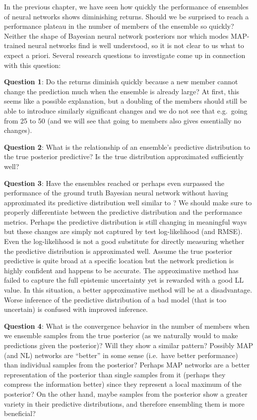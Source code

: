 \documentclass[../thesis.tex]{subfiles}
\begin{document}
In the previous chapter, we have seen how quickly the performance of ensembles of neural networks shows diminishing returns.
Should we be surprised to reach a performance plateau in the number of members of the ensemble so quickly? Neither the shape of Bayesian neural network posteriors nor which modes MAP-trained neural networks find is well understood, so it is not clear to us what to expect a priori.
Several research questions to investigate come up in connection with this question:
\medskip

\noindent \textbf{Question 1}: Do the returns diminish quickly because a new member cannot change the prediction much when the ensemble is already large? At first, this seems like a possible explanation, but a doubling of the members should still be able to introduce similarly significant changes and we do not see that e.g.\ going from 25 to 50 (and we will see that going to  members also gives essentially no changes). 
\medskip

\noindent \textbf{Question 2}: What is the relationship of an ensemble's predictive distribution to the true posterior predictive? Is the true distribution approximated sufficiently well? 
\medskip

\noindent \textbf{Question 3}: Have the ensembles reached or perhaps even surpassed the performance of the ground truth Bayesian neural network without having approximated its predictive distribution well similar to \textcite{yao2019quality}? We should make sure to properly differentiate between the predictive distribution and the performance metrics. Perhaps the predictive distribution is still changing in meaningful ways but these changes are simply not captured by test log-likelihood (and RMSE). 
Even the log-likelihood is not a good substitute for directly measuring whether the predictive distribution is approximated well.
Assume the true posterior predictive is quite broad at a specific location but the network prediction is highly confident and happens to be accurate. The approximative method has failed to capture the full epistemic uncertainty yet is rewarded with a good LL value. In this situation, a better approximative method will be at a disadvantage. Worse inference of the predictive distribution of a bad model (that is too uncertain) is confused with improved inference.
\medskip

\noindent \textbf{Question 4}: What is the convergence behavior in the number of members when we ensemble samples from the true posterior (as we naturally would to make predictions given the posterior)? Will they show a similar pattern? Possibly MAP (and NL) networks are ``better'' in some sense (i.e.\ have better performance) than individual samples from the posterior? Perhaps MAP networks are a better representation of the posterior than single samples from it (perhaps they compress the information better) since they represent a local maximum of the posterior? On the other hand, maybe samples from the posterior show a greater variety in their predictive distributions, and therefore ensembling them is more beneficial?
\medskip
\end{document}
